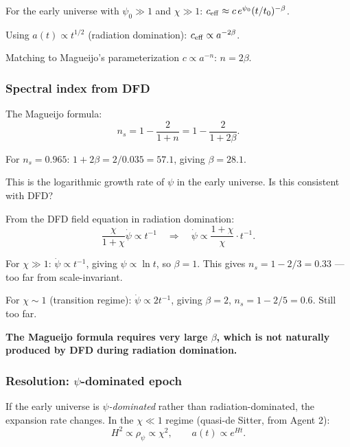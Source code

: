 \documentclass[11pt,a4paper]{article}
\begin{document}
For the early universe with $\psi_0 \gg 1$ and $\chi \gg 1$: $c_{\rm eff} \approx c\,e^{\psi_0}(t/t_0)^{-\beta}$.

Using $a(t) \propto t^{1/2}$ (radiation domination): $c_{\rm eff} \propto a^{-2\beta}$.

Matching to Magueijo's parameterization $c \propto a^{-n}$: $n = 2\beta$.

\subsubsection{Spectral index from DFD}

The Magueijo formula:
\begin{equation}
n_s = 1 - \frac{2}{1+n} = 1 - \frac{2}{1+2\beta}.
\end{equation}

For $n_s = 0.965$: $1 + 2\beta = 2/0.035 = 57.1$, giving $\beta = 28.1$.

This is the logarithmic growth rate of $\psi$ in the early universe. Is this consistent with DFD?

From the DFD field equation in radiation domination:
\begin{equation}
\frac{\chi}{1+\chi}\dot\psi \propto t^{-1} \quad \Rightarrow \quad \dot\psi \propto \frac{1+\chi}{\chi}\cdot t^{-1}.
\end{equation}

For $\chi \gg 1$: $\dot\psi \propto t^{-1}$, giving $\psi \propto \ln t$, so $\beta = 1$. This gives $n_s = 1 - 2/3 = 0.33$ --- too far from scale-invariant.

For $\chi \sim 1$ (transition regime): $\dot\psi \propto 2t^{-1}$, giving $\beta = 2$, $n_s = 1 - 2/5 = 0.6$. Still too far.

\textbf{The Magueijo formula requires very large $\beta$, which is not naturally produced by DFD during radiation domination.}

\subsubsection{Resolution: $\psi$-dominated epoch}

If the early universe is \emph{$\psi$-dominated} rather than radiation-dominated, the expansion rate changes. In the $\chi \ll 1$ regime (quasi-de Sitter, from Agent 2):
\begin{equation}
H^2 \propto \rho_\psi \propto \chi^2, \qquad a(t) \propto e^{Ht}.
\end{equation}
\end{document}
